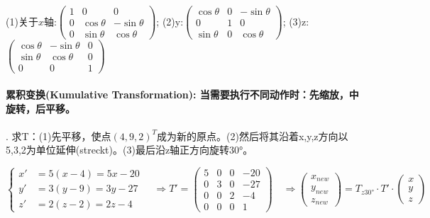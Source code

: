 \documentclass[fleqn]{article}
\begin{document}
(1)关于$x$轴:$\begin{pmatrix}
    1&0&0\\
    0&\cos\theta&-\sin\theta\\
    0&\sin\theta&\cos\theta
\end{pmatrix}$;
(2)y:$\begin{pmatrix}
    \cos\theta&0&-\sin\theta\\
    0&1&0\\
    \sin\theta&0&\cos\theta
\end{pmatrix}$;
(3)z:$\begin{pmatrix}
    \cos\theta&-\sin\theta&0\\
    \sin\theta&\cos\theta&0\\
    0&0&1
\end{pmatrix}$
\\
\\
\noindent \textbf{累积变换(Kumulative Transformation): 当需要执行不同动作时：先缩放，中旋转，后平移。}
\\
\\
. 求T：(1)先平移，使点$(4,9,2)^T$成为新的原点。(2)然后将其沿着x,y,z方向以5,3,2为单位延伸(streckt)。(3)最后沿z轴正方向旋转30°。

$\left\{\begin{aligned}
    x'&=5(x-4)=5x-20\\
    y'&=3(y-9)=3y-27\\
    z'&=2(z-2)=2z-4
\end{aligned}\right.\quad\Rightarrow T'=\begin{pmatrix}
    5&0&0&-20\\
    0&3&0&-27\\
    0&0&2&-4\\
    0&0&0&1
\end{pmatrix}\quad\Rightarrow\begin{pmatrix}
    x_{new}\\y_{new}\\z_{new}
\end{pmatrix}=T_{z30°}\cdot T' \cdot \begin{pmatrix}
    x\\y\\z
\end{pmatrix}$
\end{document}
